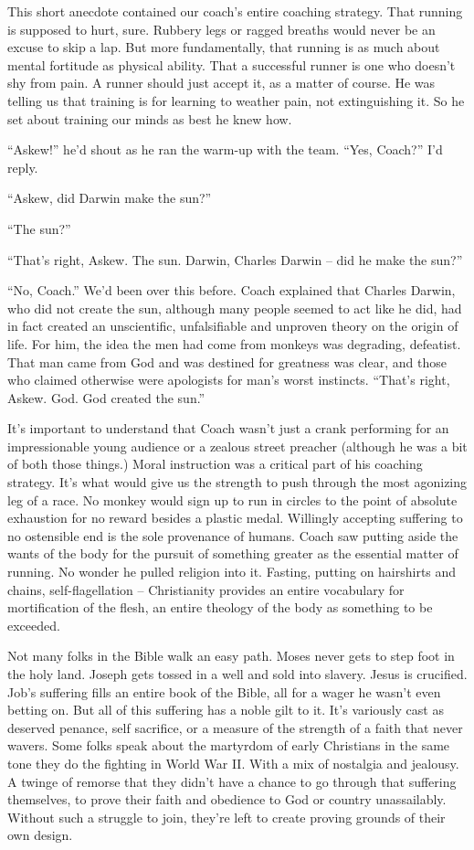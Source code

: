 \documentclass[12pt, oneside]{memoir}
\begin{document}
This short anecdote contained our coach's entire coaching strategy.
That running is supposed to hurt, sure.
Rubbery legs or ragged breaths would never be an excuse to skip a lap.
But more fundamentally, that running is as much about mental
fortitude as physical ability.
That a successful runner is one who doesn't shy from pain.
A runner should just accept it, as a matter of course.
He was telling us that training is for learning to weather pain, not
extinguishing it.
So he set about training our minds as best he knew how.

``Askew!'' he'd shout as he ran the warm-up with the team.
``Yes, Coach?'' I'd reply.

``Askew, did Darwin make the sun?''

``The sun?''

``That's right, Askew. The sun. Darwin, Charles Darwin -- did he make
the sun?''

``No, Coach.'' We'd been over this before.
Coach explained that Charles Darwin, who did not create the sun,
although many people seemed to act like he did, had in fact created an
unscientific, unfalsifiable and unproven theory on the origin of life.
For him, the idea the men had come from monkeys was degrading,
defeatist.
That man came from God and was destined for greatness was clear, and
those who claimed otherwise were apologists for man's worst instincts.
``That's right, Askew. God. God created the sun.''

It's important to understand that Coach wasn't just a crank performing
for an impressionable young audience or a zealous street preacher
(although he was a bit of both those things.)
Moral instruction was a critical part of his coaching strategy.
It's what would give us the strength to push through the most
agonizing leg of a race.
No monkey would sign up to run in circles to the point of absolute
exhaustion for no reward besides a plastic medal.
Willingly accepting suffering to no ostensible end is the sole
provenance of humans.
Coach saw putting aside the wants of the body for the pursuit of
something greater as the essential matter of running.
No wonder he pulled religion into it.
Fasting, putting on hairshirts and chains, self-flagellation --
Christianity provides an entire vocabulary for mortification of the
flesh, an entire theology of the body as something to be exceeded.

Not many folks in the Bible walk an easy path.
Moses never gets to step foot in the holy land.
Joseph gets tossed in a well and sold into slavery.
Jesus is crucified.
Job's suffering fills an entire book of the Bible, all for a wager
he wasn't even betting on.
But all of this suffering has a noble gilt to it.
It's variously cast as deserved penance, self sacrifice, or a measure
of the strength of a faith that never wavers.
Some folks speak about the martyrdom of early Christians in the same
tone they do the fighting in World War II.
With a mix of nostalgia and jealousy.
A twinge of remorse that they didn't have a chance to go through that
suffering themselves, to prove their faith and obedience to God or
country unassailably.
Without such a struggle to join, they're left to create proving
grounds of their own design.
\end{document}
